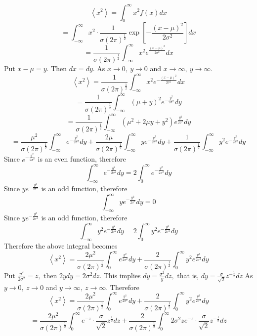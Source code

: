 \documentclass{article}
\begin{document}
\begin{flushleft}
$$
\left\langle x^{2}\right\rangle=\int_{0}^{\infty} x^{2} f(x) d x
$$
$$
=\int_{-\infty}^{\infty} x^{2} \cdot \frac{1}{\sigma(2 \pi)^{\frac{1}{2}}} \exp \left[-\frac{(x-\mu)^{2}}{2 \sigma^{2}}\right] d x
$$
$$
=\frac{1}{\sigma(2 \pi)^{\frac{1}{2}}} \int_{-\infty}^{\infty} x^{2} e^{\frac{(x-\mu)^{2}}{2 \sigma^{2}}} d x
$$
Put $x-\mu=y .$ Then $d x=d y .$ As $x \rightarrow 0, \  y \rightarrow 0$ and $x \rightarrow \infty, \  y \rightarrow \infty$.
$$
\left\langle x^{2}\right\rangle=\frac{1}{\sigma(2 \pi)^{\frac{1}{2}}} \int_{-\infty}^{\infty} x^{2} e^{-\frac{(x-\mu)^{2}}{2 \sigma^{2}}} d x
$$
$$
=\frac{1}{\sigma(2 \pi)^{\frac{1}{2}}} \int_{-\infty}^{\infty}(\mu+y)^{2} e^{-\frac{y^{2}}{2 \sigma^{2}}} d y
$$
$$
=\frac{1}{\sigma(2 \pi)^{\frac{1}{2}}} \int_{-\infty}^{\infty}\left(\mu^{2}+2 \mu y+y^{2}\right) e^{\frac{y^{2}}{2 \sigma^{2}}} d y
$$
$$
=\frac{\mu^{2}}{\sigma(2 \pi)^{\frac{1}{2}}} \int_{-\infty}^{\infty} e^{-\frac{y^{2}}{2 \sigma^{2}}} d y+\frac{2 \mu}{\sigma(2 \pi)^{\frac{1}{2}}} \int_{-\infty}^{\infty} y e^{-\frac{y^{2}}{2 \sigma^{2}}} d y+\frac{1}{\sigma(2 \pi)^{\frac{1}{2}}} \int_{-\infty}^{\infty} y^{2} e^{-\frac{y^{2}}{2 \sigma^{2}}} d y
$$
Since $e^{-\frac{y^{2}}{2 \sigma^{2}}}$ is an even function, therefore
$$
\int_{-\infty}^{\infty} e^{-\frac{y^{2}}{2 \sigma^{2}}} d y=2 \int_{0}^{\infty} e^{-\frac{y^{2}}{2 \sigma^{2}}} d y
$$
Since $y e^{-\frac{y^{2}}{2 \sigma^{2}}}$ is an odd function, therefore
$$
\int_{-\infty}^{\infty} y e^{-\frac{y^{2}}{2 \sigma^{2}}} d y=0
$$
Since $y e^{-\frac{y^{2}}{2 \sigma^{2}}}$ is an odd function, therefore
$$
\int_{-\infty}^{\infty} y^{2} e^{-\frac{y^{2}}{2 \sigma^{2}}} d y=2 \int_{0}^{\infty} y^{2} e^{-\frac{y^{2}}{2 \sigma^{2}}} d y
$$
Therefore the above integral becomes
$$
\left\langle x^{2}\right\rangle=\frac{2 \mu^{2}}{\sigma(2 \pi)^{\frac{1}{2}}} \int_{0}^{\infty} e^{\frac{y^{2}}{2 \sigma^{2}}} d y+\frac{2}{\sigma(2 \pi)^{\frac{1}{2}}} \int_{0}^{\infty} y^{2} e^{\frac{y^{2}}{2 \sigma^{2}}} d y
$$
Put $\frac{y^{2}}{2 \sigma^{2}}=z,$ then $2 y d y=2 \sigma^{2} d z$. This implies $d y=\frac{\sigma^{2}}{y} d z,$ that is, $d y=\frac{\sigma}{\sqrt{2}} z^{-\frac{1}{2}} d z$
As $y \rightarrow 0, \  z \rightarrow 0$ and $y \rightarrow \infty, \  z \rightarrow \infty$. Therefore
$$\left\langle x^{2}\right\rangle=\frac{2 \mu^{2}}{\sigma(2 \pi)^{\frac{1}{2}}} \int_{0}^{\infty} e^{\frac{y^{2}}{2 \sigma^{2}}} d y+\frac{2}{\sigma(2 \pi)^{\frac{1}{2}}} \int_{0}^{\infty} y^{2} e^{\frac{y^{2}}{2 \sigma^{2}}} d y$$
$$=\frac{2 \mu^{2}}{\sigma(2 \pi)^{\frac{1}{2}}} \int_{0}^{\infty} e^{-z} \cdot \frac{\sigma}{\sqrt{2}} z^{\frac{1}{2}} d z+\frac{2}{\sigma(2 \pi)^{\frac{1}{2}}} \int_{0}^{\infty} 2 \sigma^{2} z e^{-z} \cdot \frac{\sigma}{\sqrt{2}} z^{-\frac{1}{2}} d z$$

\end{flushleft}
\end{document}

